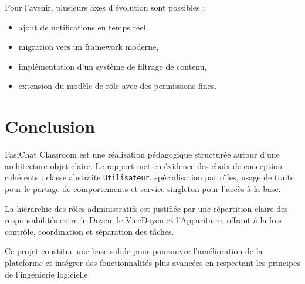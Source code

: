 \documentclass[12pt,a4paper]{article}
\begin{document}
Pour l'avenir, plusieurs axes d'évolution sont possibles :
\begin{itemize}
  \item ajout de notifications en temps réel,
  \item migration vers un framework moderne,
  \item implémentation d'un système de filtrage de contenu,
  \item extension du modèle de rôle avec des permissions fines.
\end{itemize}

\section{Conclusion}
FasiChat Classroom est une réalisation pédagogique structurée autour d'une architecture objet claire. Le rapport met en évidence des choix de conception cohérents : classe abstraite \texttt{Utilisateur}, spécialisation par rôles, usage de traits pour le partage de comportements et service singleton pour l'accès à la base.

La hiérarchie des rôles administratifs est justifiée par une répartition claire des responsabilités entre le Doyen, le ViceDoyen et l'Apparitaire, offrant à la fois contrôle, coordination et séparation des tâches.

Ce projet constitue une base solide pour poursuivre l'amélioration de la plateforme et intégrer des fonctionnalités plus avancées en respectant les principes de l'ingénierie logicielle.
\end{document}
